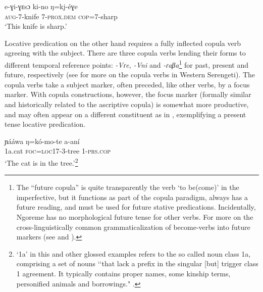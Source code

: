 \documentclass[output=paper,colorlinks,citecolor=brown,draftmode]{langscibook}
\begin{document}
\ea\label{ex:ngo:28} 
    \gll e-ɣi-ɣɛsɔ ki-no ŋ=kj-éɣe \\ 
     \textsc{aug-}7-knife 7-\textsc{prox.dem} \textsc{cop=7-}sharp\\
    \glt ‘This knife is sharp.’
\z 

Locative predication on the other hand requires a fully inflected copula verb agreeing with the subject. There are three copula verbs lending their forms to different temporal reference points: \textit{{}-Vɾe, -Vni} and \textit{{}-ɾaβa}\footnote{The “future copula” is quite transparently the verb ‘to be(come)’ in the imperfective, but it functions as part of the copula paradigm, always has a future reading, and must be used for future stative predications. Incidentally, Ngoreme has no morphological future tense for other verbs. For more on the cross-linguistically common grammaticalization of become-verbs into future markers (see \citealt{Dahl2000} and \citealt[86--87]{KutevaEtAl2019}).} for past, present and future, respectively (see \citealt{BernanderLaine2020} for more on the copula verbs in Western Serengeti). The copula verbs take a subject marker, often preceded, like other verbs, by a focus marker. With copula constructions, however, the focus marker (formally similar and historically related to the ascriptive copula) is somewhat more productive, and may often appear on a different constituent as in , exemplifying a present tense locative predication.

\ea\label{ex:ngo:29} 
    \gll ɲááwa ŋ=kó-mo-te a-aní\\ 
     1a.cat \textsc{foc=loc17}{}-3-tree 1\textsc{{}-prs.cop}\\
    \glt ‘The cat is in the tree.’\footnote{‘1a' in this and other glossed examples refers to the so called noun class 1a, comprising a set of nouns ‘‘that lack a prefix in the singular [but] trigger class 1 agreement. It typically contains proper names, some kinship terms, personified animals
and borrowings." \citep[240]{Velde2019}.}
\z 
\end{document}

